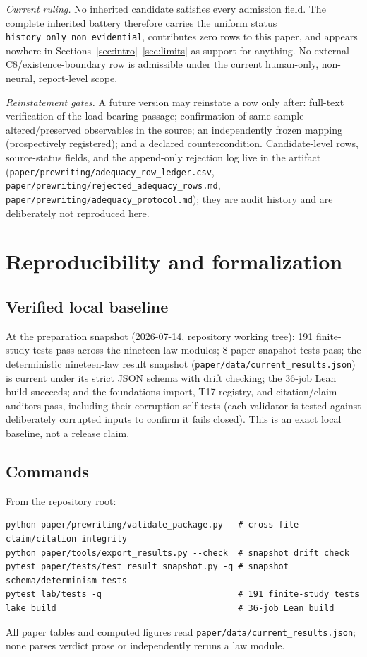 \documentclass[11pt]{article}
\theoremstyle{definition}
\begin{document}
\emph{Current ruling.} No inherited candidate satisfies every admission
field. The complete inherited battery therefore carries the uniform status
\texttt{history\_only\_non\_evidential}, contributes zero rows to this paper,
and appears nowhere in Sections~\ref{sec:intro}--\ref{sec:limits} as support
for anything. No external C8/existence-boundary row is admissible under the
current human-only, non-neural, report-level scope.

\emph{Reinstatement gates.} A future version may reinstate a row only after:
full-text verification of the load-bearing passage; confirmation of
same-sample altered/preserved observables in the source; an independently
frozen mapping (prospectively registered); and a declared countercondition.
Candidate-level rows, source-status fields, and the append-only rejection log
live in the artifact
(\texttt{paper/prewriting/adequacy\_row\_ledger.csv},
\texttt{paper/prewriting/rejected\_adequacy\_rows.md},
\texttt{paper/prewriting/adequacy\_protocol.md}); they are audit history and
are deliberately not reproduced here.

 \section{Reproducibility and formalization}
\label{app:repro}


\subsection{Verified local baseline}

At the preparation snapshot (2026-07-14, repository working tree): 191
finite-study tests pass across the nineteen law modules; 8 paper-snapshot
tests pass; the deterministic nineteen-law result snapshot
(\texttt{paper/data/current\_results.json}) is current under its strict JSON
schema with drift checking; the 36-job Lean build succeeds; and the
foundations-import, T17-registry, and citation/claim auditors pass, including
their corruption self-tests (each validator is tested against deliberately
corrupted inputs to confirm it fails closed). This is an exact local
baseline, not a release claim.

\subsection{Commands}

From the repository root:
\begin{verbatim}
python paper/prewriting/validate_package.py   # cross-file claim/citation integrity
python paper/tools/export_results.py --check  # snapshot drift check
pytest paper/tests/test_result_snapshot.py -q # snapshot schema/determinism tests
pytest lab/tests -q                           # 191 finite-study tests
lake build                                    # 36-job Lean build
\end{verbatim}
All paper tables and computed figures read
\texttt{paper/data/current\_results.json}; none parses verdict prose or
independently reruns a law module.
\end{document}
